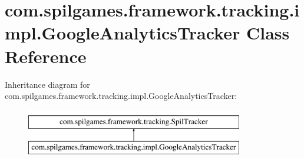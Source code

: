 \hypertarget{classcom_1_1spilgames_1_1framework_1_1tracking_1_1impl_1_1_google_analytics_tracker}{\section{com.\-spilgames.\-framework.\-tracking.\-impl.\-Google\-Analytics\-Tracker Class Reference}
\label{classcom_1_1spilgames_1_1framework_1_1tracking_1_1impl_1_1_google_analytics_tracker}
}
Inheritance diagram for com.\-spilgames.\-framework.\-tracking.\-impl.\-Google\-Analytics\-Tracker\-:\begin{figure}[H]
\begin{center}
\leavevmode
\includegraphics[height=2.000000cm]{classcom_1_1spilgames_1_1framework_1_1tracking_1_1impl_1_1_google_analytics_tracker}
\end{center}
\end{figure}
